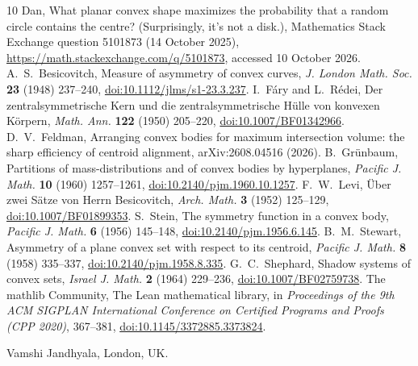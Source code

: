 \documentclass[11pt]{article}
\theoremstyle{remark}
\begin{document}
\begin{thebibliography}{10}
 Dan, What planar convex shape maximizes the probability that a random circle contains the
centre? (Surprisingly, it's not a disk.), Mathematics Stack Exchange question 5101873 (14 October 2025),
\url{https://math.stackexchange.com/q/5101873}, accessed 10 October 2026.
 A.~S.~Besicovitch, Measure of asymmetry of convex curves, \emph{J. London Math. Soc.}
\textbf{23} (1948) 237--240, \href{https://doi.org/10.1112/jlms/s1-23.3.237}{doi:10.1112/jlms/s1-23.3.237}.
 I.~F\'ary and L.~R\'edei, Der zentralsymmetrische Kern und die zentralsymmetrische H\"ulle
von konvexen K\"orpern, \emph{Math. Ann.} \textbf{122} (1950) 205--220,
\href{https://doi.org/10.1007/BF01342966}{doi:10.1007/BF01342966}.
 D.~V.~Feldman, Arranging convex bodies for maximum intersection volume: the sharp
efficiency of centroid alignment, arXiv:2608.04516 (2026).
 B.~Gr\"unbaum, Partitions of mass-distributions and of convex bodies by hyperplanes,
\emph{Pacific J. Math.} \textbf{10} (1960) 1257--1261,
\href{https://doi.org/10.2140/pjm.1960.10.1257}{doi:10.2140/pjm.1960.10.1257}.
 F.~W.~Levi, \"Uber zwei S\"atze von Herrn Besicovitch, \emph{Arch. Math.} \textbf{3}
(1952) 125--129, \href{https://doi.org/10.1007/BF01899353}{doi:10.1007/BF01899353}.
 S.~Stein, The symmetry function in a convex body, \emph{Pacific J. Math.} \textbf{6}
(1956) 145--148, \href{https://doi.org/10.2140/pjm.1956.6.145}{doi:10.2140/pjm.1956.6.145}.
 B.~M.~Stewart, Asymmetry of a plane convex set with respect to its centroid,
\emph{Pacific J. Math.} \textbf{8} (1958) 335--337,
\href{https://doi.org/10.2140/pjm.1958.8.335}{doi:10.2140/pjm.1958.8.335}.
 G.~C.~Shephard, Shadow systems of convex sets, \emph{Israel J. Math.} \textbf{2} (1964)
229--236, \href{https://doi.org/10.1007/BF02759738}{doi:10.1007/BF02759738}.
 The mathlib Community, The Lean mathematical library, in \emph{Proceedings of the
9th ACM SIGPLAN International Conference on Certified Programs and Proofs (CPP 2020)}, 367--381,
\href{https://doi.org/10.1145/3372885.3373824}{doi:10.1145/3372885.3373824}.
\end{thebibliography}

\bigskip
\noindent Vamshi Jandhyala, London, UK.
\end{document}
